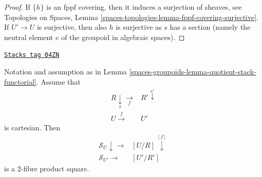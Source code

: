 \begin{proof}
\medskip\noindent
If $\{h\}$ is an fppf covering, then it induces a surjection of sheaves, see
Topologies on Spaces,
Lemma \ref{spaces-topologies-lemma-fppf-covering-surjective}.
If $U' \to U$ is surjective, then also $h$ is surjective as $s$ has a section
(namely the neutral element $e$ of the groupoid in algebraic spaces).
\end{proof}

\begin{lemma}
\label{spaces-groupoids-lemma-criterion-fibre-product}
\href{https://stacks.math.columbia.edu/tag/04ZN}{\texttt{Stacks tag 04ZN}}

Notation and assumption as in
Lemma \ref{spaces-groupoids-lemma-quotient-stack-functorial}.
Assume that
$$
\begin{array}{cc}R \underset{s}{\downarrow}\underset{f}{\longrightarrow} & R' \overset{s'}{\downarrow} \\ U \overset{f}{\longrightarrow} & U'\end{array}
$$
is cartesian. Then
$$
\begin{array}{cc}\mathcal{S}_U \downarrow\longrightarrow & [U/R] \overset{[f]}{\downarrow} \\ \mathcal{S}_{U'} \longrightarrow & [U'/R']\end{array}
$$
is a $2$-fibre product square.
\end{lemma}

